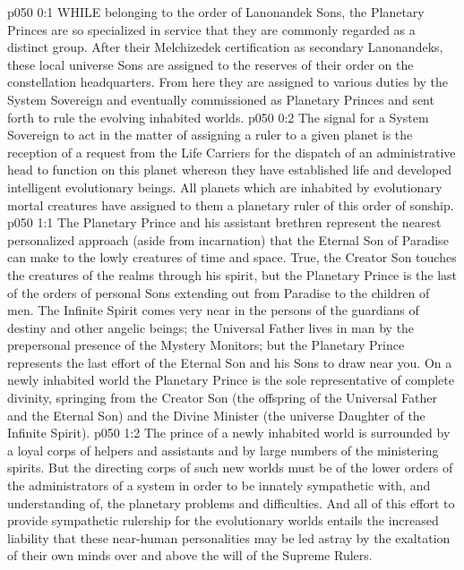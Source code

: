 \vs p050 0:1 WHILE belonging to the order of Lanonandek Sons, the Planetary Princes are so specialized in service that they are commonly regarded as a distinct group. After their Melchizedek certification as secondary Lanonandeks, these local universe Sons are assigned to the reserves of their order on the constellation headquarters. From here they are assigned to various duties by the System Sovereign and eventually commissioned as Planetary Princes and sent forth to rule the evolving inhabited worlds.
\vs p050 0:2 The signal for a System Sovereign to act in the matter of assigning a ruler to a given planet is the reception of a request from the Life Carriers for the dispatch of an administrative head to function on this planet whereon they have established life and developed intelligent evolutionary beings. All planets which are inhabited by evolutionary mortal creatures have assigned to them a planetary ruler of this order of sonship.
\vs p050 1:1 The Planetary Prince and his assistant brethren represent the nearest personalized approach (aside from incarnation) that the Eternal Son of Paradise can make to the lowly creatures of time and space. True, the Creator Son touches the creatures of the realms through his spirit, but the Planetary Prince is the last of the orders of personal Sons extending out from Paradise to the children of men. The Infinite Spirit comes very near in the persons of the guardians of destiny and other angelic beings; the Universal Father lives in man by the prepersonal presence of the Mystery Monitors; but the Planetary Prince represents the last effort of the Eternal Son and his Sons to draw near you. On a newly inhabited world the Planetary Prince is the sole representative of complete divinity, springing from the Creator Son (the offspring of the Universal Father and the Eternal Son) and the Divine Minister (the universe Daughter of the Infinite Spirit).
\vs p050 1:2 The prince of a newly inhabited world is surrounded by a loyal corps of helpers and assistants and by large numbers of the ministering spirits. But the directing corps of such new worlds must be of the lower orders of the administrators of a system in order to be innately sympathetic with, and understanding of, the planetary problems and difficulties. And all of this effort to provide sympathetic rulership for the evolutionary worlds entails the increased liability that these near\hyp{}human personalities may be led astray by the exaltation of their own minds over and above the will of the Supreme Rulers.
